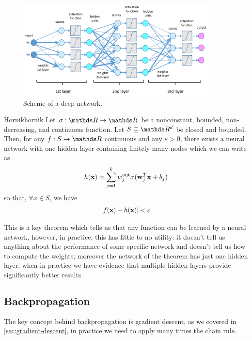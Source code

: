 \documentclass[12pt]{extarticle}
\renewcommand{\vec}[1]{\bvec{#1}}
\begin{document}
\begin{figure}
	\centering
	\includegraphics[width=0.9\textwidth]{./assets/modelling-ml/deep-network.png}
	\caption{Scheme of a deep network.}
\end{figure}

\begin{theorem}{Hornik}{hornik}
	Let $\sigma: \R \to \R$ be a nonconstant, bounded, non-decreasing, and continuous function.
	Let $S \subseteq \R^d$ be closed and bounded.
	Then, for any $f: S \to \R$ continuous and any $\varepsilon > 0$, there exists a neural network
	with one hidden layer containing finitely many nodes which we can write as
	\begin{equation}
		h(\vec x) = \sum_{j = 1}^k w^\text{out}_j \sigma(\vec w_j^T \vec x + b_j)
	\end{equation}
	so that, $\forall x \in S$, we have
	\begin{equation}
		\abs{f(\vec x) - h(\vec x)} < \varepsilon
	\end{equation}
\end{theorem}

This is a key theorem which tells us that any function can be learned by a neural network, however,
in practice, this has little to no utility: it doesn't tell us anything about the performance of
some specific network and doesn't tell us how to compute the weights; moreover the network of the
theorem has just one hidden layer, when in practice we have evidence that multiple hidden layers
provide significantly better results.

\subsection{Backpropagation}

The key concept behind backpropagation is gradient descent, as we covered in
\cref{sec:gradient-descent}, in practice we need to apply many times the chain rule.
\end{document}
